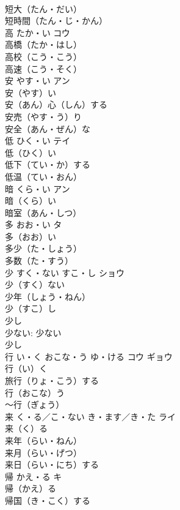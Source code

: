 \documentclass[8pt]{extreport}
\begin{document}
\begin{CJK}{UTF8}{min}
\\	短大（たん・だい）　
\\	短時間（たん・じ・かん）　
\\	高	たか・い	コウ	
\\	高橋（たか・はし） 
\\	高校（こう・こう）　
\\	高速（こう・そく）　
\\	安	やす・い	アン	
\\	安（やす）い　
\\	安（あん）心（しん）する　
\\	安売（やす・う）り　
\\	安全（あん・ぜん）な　
\\	低	ひく・い	テイ	
\\	低（ひく）い　
\\	低下（てい・か）する　
\\	低温（てい・おん）　
\\	暗	くら・い	アン	
\\	暗（くら）い　
\\	暗室（あん・しつ）　
\\	多	おお・い	タ	
\\	多（おお）い　
\\	多少（た・しょう）　
\\	多数（た・すう）　
\\	少	すく・ない すこ・し	ショウ	
\\	少（すく）ない　
\\	少年（しょう・ねん）　
\\	少（すこ）し 
\\	少し 
\\	少ない: 少ない 
\\	少し 
\\	行	い・く おこな・う ゆ・ける	コウ ギョウ	
\\	行（い）く　
\\	旅行（りょ・こう）する　
\\	行（おこな）う　
\\	～行（ぎょう）　
\\	来	く・る／こ・ない き・ます／き・た	ライ	
\\	来（く）る　
\\	来年（らい・ねん）　
\\	来月（らい・げつ）　
\\	来日（らい・にち）する　
\\	帰	かえ・る	キ	
\\	帰（かえ）る　
\\	帰国（き・こく）する　

\end{CJK}
\end{document}

